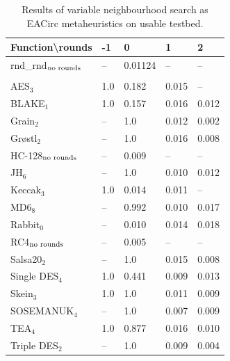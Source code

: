 \documentclass[
    digital,    %
    oneside,    %
    color,
    11pt,
    nocover,
    notable,
    nolof,
    nolot,
]{fithesis3}
\newcommand{\fd}{\cellcolor{red!25}}
\newcommand{\fn}{}
\begin{document}
\begin{table}[H]
\centering
\begin{tabular}{l|l l l l}
\textbf{\large Function\textbackslash{}rounds} & \textbf{\large -1} & \textbf{\large 0} & \textbf{\large 1} & \textbf{\large 2}\\ \hline
rnd\_rnd$_{\textnormal{no rounds}}$ & -- & \fn{}0.01124 & -- & --   \\\\
AES$_{3}$        & \fd{}1.0   & \fd{}0.182 & \fn{}0.015 & \fn{}--   \\
BLAKE$_{1}$      & \fd{}1.0   & \fd{}0.157 & \fn{}0.016 & \fn{}0.012\\
Grain$_{2}$      & \fd{}--    & \fd{}1.0   & \fn{}0.012 & \fn{}0.002\\
Gr\o stl$_{2}$   & \fd{}--    & \fd{}1.0   & \fn{}0.016 & \fn{}0.008\\
HC-128$_{\textnormal{no rounds}}$& -- & \fn{}0.009 & -- & --        \\
JH$_{6}$         & \fd{}--    & \fd{}1.0   & \fn{}0.010 & \fn{}0.012\\
Keccak$_{3}$     & \fd{}1.0   & \fn{}0.014 & \fn{}0.011 & \fn{}--   \\
MD6$_{8}$        & \fd{}--    & \fd{}0.992 & \fn{}0.010 & \fn{}0.017\\
Rabbit$_{0}$     &      --    & \fn{}0.010 & \fn{}0.014 & \fn{}0.018\\
RC4$_{\textnormal{no rounds}}$& -- & \fn{}0.005 & --    & --        \\
Salsa20$_{2}$    & \fd{}--    & \fd{}1.0   & \fn{}0.015 & \fn{}0.008\\
Single DES$_{4}$ & \fd{}1.0   & \fd{}0.441 & \fn{}0.009 & \fn{}0.013\\
Skein$_{3}$      & \fd{}1.0   & \fd{}1.0   & \fn{}0.011 & \fn{}0.009\\
SOSEMANUK$_{4}$  & \fd{}--    & \fd{}1.0   & \fn{}0.007 & \fn{}0.009\\
TEA$_{4}$        & \fd{}1.0   & \fd{}0.877 & \fn{}0.016 & \fn{}0.010\\
Triple DES$_{2}$ & \fd{}--    & \fd{}1.0   & \fn{}0.009 & \fn{}0.004
\end{tabular}
\caption{Results of variable neighbourhood search as EACirc metaheuristics on usable testbed.}
\label{table:res-usable-vns}
\end{table}
\end{document}
